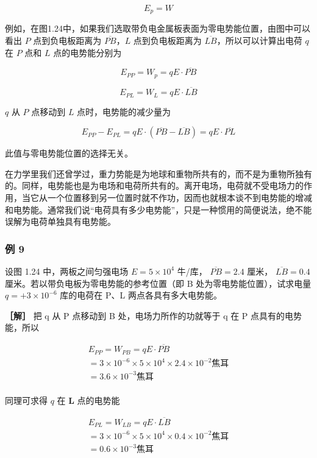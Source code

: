 \[
E_{p} = W \tag{1.4}
\]

例如，在图1.24中，如果我们选取带负电金属板表面为零电势能位置，由图中可以看出
\(P\) 点到负电板距离为 \(\overline{PB}\)，\(L\) 点到负电板距离为
\(\overline{LB}\)，所以可以计算出电荷 \(q\) 在 \(P\) 点和 \(L\)
点的电势能分别为

\[
E_{P P} = W_{p} = q E \cdot \overline {{P B}}
\]

\[
E_{P L} = W_{L} = q E \cdot \overline {{L B}}
\]

\(q\) 从 \(P\) 点移动到 \(L\) 点时，电势能的减少量为

\[
E_{P P} - E_{P L} = q E \cdot (\overline {{P B}} - \overline {{L B}}) = q E \cdot \overline {{P L}}
\]

此值与零电势能位置的选择无关。

在力学里我们还曾学过，重力势能是为地球和重物所共有的，而不是为重物所独有的。同样，电势能也是为电场和电荷所共有的。离开电场，电荷就不受电场力的作用，当它从一个位置移到另一位置时就不作功，因而也就根本谈不到电势能的增减和电势能。通常我们说``电荷具有多少电势能''，只是一种惯用的简便说法，绝不能误解为电荷单独具有电势能。

\subsubsection{例 9}\label{ux4f8b-9}

设图 1.24 中，两板之间匀强电场 \(E=5\times10^{4}\) 牛/库，
\(\overline{PB}=2.4\) 厘米， \(\overline{LB}=0.4\)
厘米。若以带负电板为零电势能的参考位置（即 B
处为零电势能位置），试求电量 \(q=+3\times10^{-6}\) 库的电荷在 P、L
两点各具有多大电势能。

\textbf{［解］} 把 q 从 P 点移动到 B 处，电场力所作的功就等于 q 在 P
点具有的电势能，所以

\[
\begin{array}{l} E_{P P} = W_{P B} = q E \cdot \overline {{P B}} \\ = 3 \times 10^{- 6} \times 5 \times 10^{4} \times 2.4 \times 10^{- 2} \text{焦耳} \\ = 3.6 \times 10^{- 3} \text{焦耳} \\ \end{array}
\]

同理可求得 \(q\) 在 \(\pmb{L}\) 点的电势能

\[
\begin{array}{l} E_{P L} = W_{L B} = q E \cdot \overline {{{L B}}} \\ = 3 \times 10^{- 6} \times 5 \times 10^{4} \times 0.4 \times 10^{- 2} \text{焦耳} \\ = 0.6 \times 10^{- 3} \text{焦耳} \\ \end{array}
\]

